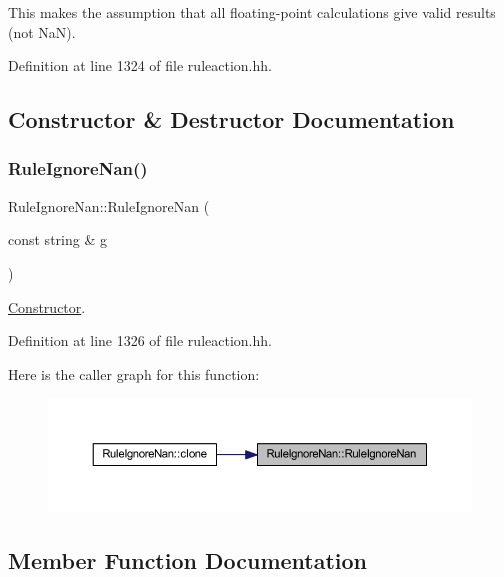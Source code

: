 This makes the assumption that all floating-\/point calculations give valid results (not NaN). 

Definition at line 1324 of file ruleaction.\+hh.



\subsection{Constructor \& Destructor Documentation}
\mbox{\label{class_rule_ignore_nan_a9a8949fd2e8ceac2647f741070489bde}} 
\subsubsection{\texorpdfstring{RuleIgnoreNan()}{RuleIgnoreNan()}}
{\footnotesize\ttfamily Rule\+Ignore\+Nan\+::\+Rule\+Ignore\+Nan (\begin{DoxyParamCaption}\item[{const string \&}]{g }\end{DoxyParamCaption})\hspace{0.3cm}{\ttfamily [inline]}}



\mbox{\hyperlink{class_constructor}{Constructor}}. 



Definition at line 1326 of file ruleaction.\+hh.

Here is the caller graph for this function\+:
\nopagebreak
\begin{figure}[H]
\begin{center}
\leavevmode
\includegraphics[width=350pt]{class_rule_ignore_nan_a9a8949fd2e8ceac2647f741070489bde_icgraph}
\end{center}
\end{figure}


\subsection{Member Function Documentation}
\mbox{\label{class_rule_ignore_nan_afd2b8e067067db3127664cd2cedfd092}} 
